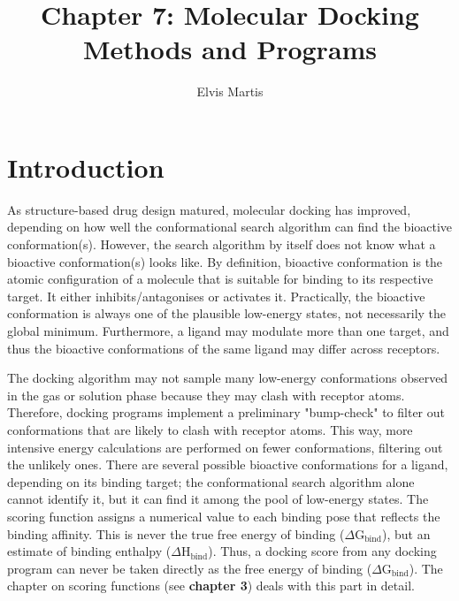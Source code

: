 \documentclass[12pt]{article}
\title{Chapter 7: Molecular Docking Methods and Programs}
\author{Elvis Martis}
\date{}
\begin{document}
\maketitle

\section{Introduction}
As structure-based drug design matured, molecular docking has improved, depending on how well the conformational search algorithm can find the bioactive conformation(s). However, the search algorithm by itself does not know what a bioactive conformation(s) looks like. By definition, bioactive conformation is the atomic configuration of a molecule that is suitable for binding to its respective target. It either inhibits/antagonises or activates it. Practically, the bioactive conformation is always one of the plausible low-energy states, not necessarily the global minimum. Furthermore, a ligand may modulate more than one target, and thus the bioactive conformations of the same ligand may differ across receptors. 

The docking algorithm may not sample many low-energy conformations observed in the gas or solution phase because they may clash with receptor atoms. Therefore, docking programs implement a preliminary "bump-check" to filter out conformations that are likely to clash with receptor atoms. This way, more intensive energy calculations are performed on fewer conformations, filtering out the unlikely ones. There are several possible bioactive conformations for a ligand, depending on its binding target; the conformational search algorithm alone cannot identify it, but it can find it among the pool of low-energy states. The scoring function assigns a numerical value to each binding pose that reflects the binding affinity. This is never the true free energy of binding ($\Delta$\textrm{G}$_{\textrm{bind}}$), but an estimate of binding enthalpy ($\Delta$\textrm{H}$_{\textrm{bind}}$). Thus, a docking score from any docking program can never be taken directly as the free energy of binding ($\Delta$\textrm{G}$_{\textrm{bind}}$). The chapter on scoring functions (see \textbf{chapter 3}) deals with this part in detail. 
\end{document}
